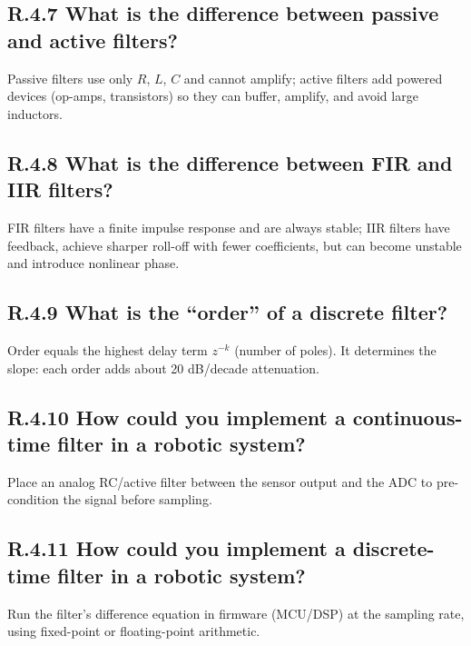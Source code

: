 \documentclass{article}
\begin{document}
\subsection*{R.4.7 What is the difference between passive and active filters?}

Passive filters use only $R$, $L$, $C$ and cannot amplify; active filters add powered devices (op-amps, transistors) so they can buffer, amplify, and avoid large inductors.

\subsection*{R.4.8 What is the difference between FIR and IIR filters?}

FIR filters have a finite impulse response and are always stable; IIR filters have feedback, achieve sharper roll-off with fewer coefficients, but can become unstable and introduce nonlinear phase.

\subsection*{R.4.9 What is the “order” of a discrete filter?}

Order equals the highest delay term $z^{-k}$ (number of poles).  It determines the slope: each order adds about 20 dB/decade attenuation.

\subsection*{R.4.10 How could you implement a continuous-time filter in a robotic system?}

Place an analog RC/active filter between the sensor output and the ADC to pre-condition the signal before sampling.

\subsection*{R.4.11 How could you implement a discrete-time filter in a robotic system?}

Run the filter’s difference equation in firmware (MCU/DSP) at the sampling rate, using fixed-point or floating-point arithmetic.
\end{document}
